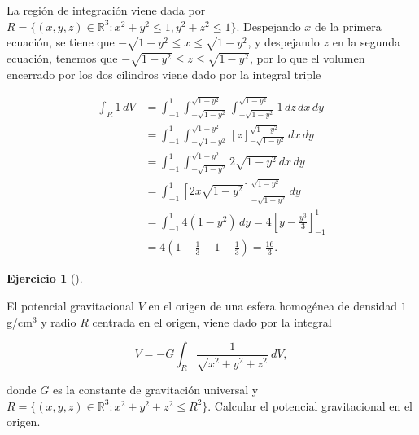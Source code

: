 \documentclass[
  spanish,
  a4paper,
]{scrreport}
\theoremstyle{definition}
\newtheorem{exercise}{Ejercicio}[chapter]
\theoremstyle{remark}
\begin{document}
\begin{tcolorbox}[enhanced jigsaw, arc=.35mm, bottomrule=.15mm, bottomtitle=1mm, breakable, colback=white, colbacktitle=quarto-callout-tip-color!10!white, colframe=quarto-callout-tip-color-frame, coltitle=black, left=2mm, leftrule=.75mm, opacityback=0, opacitybacktitle=0.6, rightrule=.15mm, title=\textcolor{quarto-callout-tip-color}{\faLightbulb}\hspace{0.5em}{Solución}, titlerule=0mm, toprule=.15mm, toptitle=1mm]

La región de integración viene dada por
\(R=\{(x,y,z)\in\mathbb{R}^3: x^2+y^2\leq 1, y^2+z^2\leq 1\}\).
Despejando \(x\) de la primera ecuación, se tiene que
\(-\sqrt{1-y^2}\leq x\leq \sqrt{1-y^2}\), y despejando \(z\) en la
segunda ecuación, tenemos que \(-\sqrt{1-y^2}\leq z\leq \sqrt{1-y^2}\),
por lo que el volumen encerrado por los dos cilindros viene dado por la
integral triple

\begin{align*}
\int_R 1\,dV
&= \int_{-1}^1 \int_{-\sqrt{1-y^2}}^{\sqrt{1-y^2}} \int_{-\sqrt{1-y^2}}^{\sqrt{1-y^2}} 1\,dz\,dx\,dy \\
&= \int_{-1}^1 \int_{-\sqrt{1-y^2}}^{\sqrt{1-y^2}} \left[z\right]_{-\sqrt{1-y^2}}^{\sqrt{1-y^2}}\,dx\,dy \\
&= \int_{-1}^1 \int_{-\sqrt{1-y^2}}^{\sqrt{1-y^2}} 2\sqrt{1-y^2}\,dx\,dy \\
&= \int_{-1}^1 \left[2x\sqrt{1-y^2}\right]_{-\sqrt{1-y^2    }}^{\sqrt{1-y^2}}\,dy \\
&= \int_{-1}^1 4(1-y^2)\,dy 
= 4\left[y - \frac{y^3}{3}\right]_{-1}^1 \\
&= 4\left(1 - \frac{1}{3} -1 - \frac{1}{3}\right)
= \frac{16}{3}.
\end{align*}

\end{tcolorbox}

\begin{exercise}[]\protect\hypertarget{exr-potencial-gravitacional}{}\label{exr-potencial-gravitacional}

El potencial gravitacional \(V\) en el origen de una esfera homogénea de
densidad \(1\) g/cm\(^3\) y radio \(R\) centrada en el origen, viene
dado por la integral

\[
V = -G\int_R \frac{1}{\sqrt{x^2+y^2+z^2}}\,dV,
\]

donde \(G\) es la constante de gravitación universal y
\(R=\{(x,y,z)\in\mathbb{R}^3: x^2+y^2+z^2\leq R^2\}\). Calcular el
potencial gravitacional en el origen.

\end{exercise}
\end{document}
